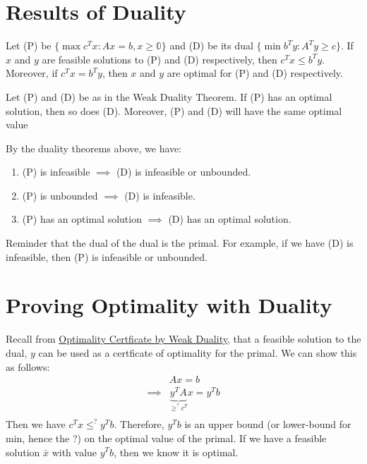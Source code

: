 \documentclass[a4paper]{report}
\begin{document}
\section{Results of Duality}
\begin{theorem}
  Let (P) be $\{\max c^Tx : Ax = b, x\geq \mathbb 0\}$ and (D) be its dual $\{\min b^Ty : A^Ty \geq c\}$. If $x$ and $y$ are feasible solutions to (P) and (D) respectively, then $c^T x \leq b^T y$. Moreover, if $c^T x = b^T y$, then $x$ and $y$ are optimal for (P) and (D) respectively.
\end{theorem}
\begin{theorem}
  Let (P) and (D) be as in the Weak Duality Theorem. If (P) has an optimal solution, then so does (D). Moreover, (P) and (D) will have the same optimal value
\end{theorem}
\begin{corollary}
  By the duality theorems above, we have:
\begin{enumerate}
  \item (P) is infeasible $\implies$ (D) is infeasible or unbounded.
  \item (P) is unbounded $\implies$ (D) is infeasible.
  \item (P) has an optimal solution $\implies$ (D) has an optimal solution.
\end{enumerate}
Reminder that the dual of the dual is the primal. For example, if we have (D) is infeasible, then (P) is infeasible or unbounded. 
\end{corollary}

\section{Proving Optimality with Duality}
Recall from \hyperref[optimality:ii]{Optimality Certficate by Weak Duality}, that a feasible solution to the dual, $y$ can be used as a certficate of optimality for the primal. We can show this as follows:
\begin{align*}
  & Ax = b \\
  \implies & \underbrace{y^TA}_{\geq^? c^T}x = y^T b \\
\end{align*}
Then we have $c^Tx \leq^? y^T b$. Therefore, $y^T b$ is an upper bound (or lower-bound for min, hence the ?) on the optimal value of the primal. If we have a feasible solution $\bar x$ with value $y^T b$, then we know it is optimal. 
\end{document}
